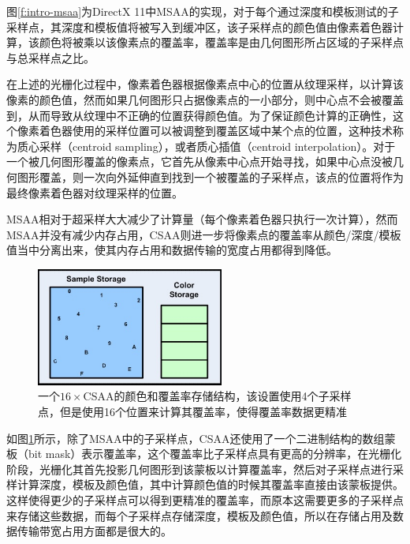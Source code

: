图\ref{f:intro-msaa}为DirectX 11中MSAA的实现，对于每个通过深度和模板测试的子采样点，其深度和模板值将被写入到缓冲区，该子采样点的颜色值由像素着色器计算，该颜色将被乘以该像素点的覆盖率，覆盖率是由几何图形所占区域的子采样点与总采样点之比。

在上述的光栅化过程中，像素着色器根据像素点中心的位置从纹理采样，以计算该像素的颜色值，然而如果几何图形只占据像素点的一小部分，则中心点不会被覆盖到，从而导致从纹理中不正确的位置获得颜色值。为了保证颜色计算的正确性，这个像素着色器使用的采样位置可以被调整到覆盖区域中某个点的位置，这种技术称为质心采样（centroid sampling），或者质心插值（centroid interpolation）。对于一个被几何图形覆盖的像素点，它首先从像素中心点开始寻找，如果中心点没被几何图形覆盖，则一次向外延伸直到找到一个被覆盖的子采样点，该点的位置将作为最终像素着色器对纹理采样的位置。

MSAA相对于超采样大大减少了计算量（每个像素着色器只执行一次计算），然而MSAA并没有减少内存占用，CSAA\cite{m:CoverageSamplingAntialiasing}则进一步将像素点的覆盖率从颜色/深度/模板值当中分离出来，使其内存占用和数据传输的宽度占用都得到降低。

\begin{figure}
\sidecaption
	\includegraphics[width=0.55\textwidth]{figures/intro/sample_coverage}
	\caption{一个$16\times$CSAA的颜色和覆盖率存储结构，该设置使用4个子采样点，但是使用16个位置来计算其覆盖率，使得覆盖率数据更精准}
	\label{f:intro-sample-coverage}
\end{figure}

如图\ref{f:intro-sample-coverage}所示，除了MSAA中的子采样点，CSAA还使用了一个二进制结构的数组蒙板（bit mask）表示覆盖率，这个覆盖率比子采样点具有更高的分辨率，在光栅化阶段，光栅化其首先投影几何图形到该蒙板以计算覆盖率，然后对子采样点进行采样计算深度，模板及颜色值，其中计算颜色值的时候其覆盖率直接由该蒙板提供。这样使得更少的子采样点可以得到更精准的覆盖率，而原本这需要更多的子采样点来存储这些数据，而每个子采样点存储深度，模板及颜色值，所以在存储占用及数据传输带宽占用方面都是很大的。


